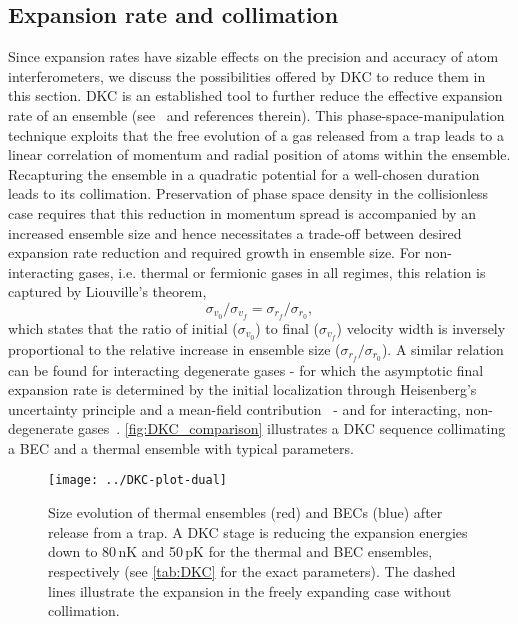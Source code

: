 \subsection{Expansion rate and collimation}
Since expansion rates have sizable effects on the precision and accuracy of atom interferometers, we discuss the possibilities offered by DKC to reduce them in this section. DKC is an established tool to further reduce the effective expansion rate of an ensemble (see~\cite{Corgier2018} and references therein). 
This phase-space-manipulation technique exploits that the free evolution of a gas released from a trap leads to a linear correlation of momentum and radial position of atoms within the ensemble. 
Recapturing the ensemble in a quadratic potential for a well-chosen duration leads to its collimation. 
Preservation of phase space density in the collisionless case requires that this reduction in momentum spread is accompanied by an increased ensemble size and hence necessitates a trade-off between desired expansion rate reduction and required growth in ensemble size. 
For non-interacting gases, i.e. thermal or fermionic gases in all regimes, this relation is captured by Liouville's theorem, 
\begin{equation}
    \sigma_{v_0}/\sigma_{v_f} =  \sigma_{r_f}/\sigma_{r_0},
\end{equation}
which states that the ratio of initial ($\sigma_{v_0}$) to final ($\sigma_{v_f}$) velocity width is inversely proportional to the relative increase in ensemble size ($\sigma_{r_f}/\sigma_{r_0}$). 
A similar relation can be found for interacting degenerate gases - for which the asymptotic final expansion rate is determined by the initial localization through Heisenberg's uncertainty principle and a mean-field contribution~\cite{Loriani2019,Castin1996,Kagan1996} - and for interacting, non-degenerate gases~\cite{GuryOdelin2002,Pedri2003}.
\autoref{fig:DKC_comparison} illustrates a DKC sequence collimating a BEC and a thermal ensemble with typical parameters.
%
\begin{figure}[h!]
    \centering
    \texttt{[image: ../DKC-plot-dual]}
    \caption{Size evolution of thermal ensembles (red) and BECs (blue) after release from a trap. A DKC stage is reducing the expansion energies down to 80\,nK and 50\,pK for the thermal and BEC ensembles, respectively (see \autoref{tab:DKC} for the exact parameters). The dashed lines illustrate the expansion in the freely expanding case without collimation. 
    }
   \label{fig:DKC_comparison}
\end{figure}
